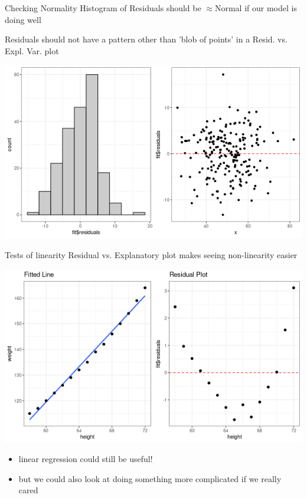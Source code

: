 \documentclass{beamer}
\begin{document}
\begin{frame}{Checking Normality}
Histogram of Residuals should be $\approx$Normal if our model is doing well \vspace{2mm}

Residuals should not have a pattern other than 'blob of points' in a Resid. vs. Expl. Var. plot
\begin{center}
\includegraphics[scale=0.5]{norm_errors.png}
\end{center}
\end{frame}

\begin{frame}{Tests of linearity}
Residual vs. Explanatory plot makes seeing non-linearity easier
\begin{center}
\includegraphics[scale=0.5]{women_error.png}
\end{center}
\footnotesize
\begin{itemize}
    \item linear regression could still be useful!
    \item but we could also look at doing something more complicated if we really cared
\end{itemize}
\end{frame}
\end{document}
